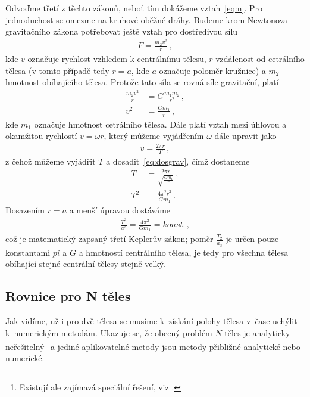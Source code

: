 \documentclass[A4paper, 12pt, oneside]{book}%
\begin{document}
Odvoďme třetí z těchto zákonů, neboť tím dokážeme vztah~\eqref{eq:n}. Pro jednoduchost se omezme na kruhové oběžné dráhy. Budeme krom Newtonova gravitačního zákona potřebovat ještě vztah pro dostředivou sílu
\begin{align}
	F=\frac{m_2v^2}{r}\,,
\end{align}
kde $v$ označuje rychlost vzhledem k centrálnímu tělesu, $r$ vzdálenost od cetrálního tělesa (v tomto případě tedy $r=a$, kde $a$ označuje poloměr kružnice) a $m_2$ hmotnost obíhajícího tělesa. Protože tato síla se rovná síle gravitační, platí
\begin{align}
	\nonumber \frac{m_2v^2}{r}&=G\frac{m_1m_2}{r^2}\,, \\
	v^2&=\frac{Gm_1}{r}\,, \label{eq:dosgrav}
\end{align}
kde $m_1$ označuje hmotnost cetrálního tělesa. Dále platí vztah mezi úhlovou a okamžitou rychlostí $v=\omega r$, který můžeme vyjádřením $\omega$ dále upravit jako
\begin{align}
	v=\frac{2\pi r}{T}\,,
\end{align}
z čehož můžeme vyjádřit $T$ a dosadit~\eqref{eq:dosgrav}, čímž dostaneme
\begin{align}
	T&=\frac{2\pi r}{\sqrt{\frac{Gm_1}{r}}}\,, \\
	T^2&=\frac{4\pi^2 r^3}{Gm_1}\,.
\end{align}
Dosazením $r=a$ a menší úpravou dostáváme
\begin{align*}
	\frac{T^2}{a^3}=\frac{4\pi^2}{Gm_1}=konst.\,,
\end{align*}
což je matematický zapsaný třetí Keplerův zákon; poměr $\frac{T_2}{a_3}$ je určen pouze konstantami $pi$ a $G$ a hmotností centrálního tělesa, je tedy pro všechna tělesa obíhající stejné centrální tělesy stejně velký.


\subsection{Rovnice pro N těles}
Jak vidíme, už i pro dvě tělesa se musíme k~získání polohy tělesa v~čase uchýlit k~numerickým metodám. Ukazuje se, že obecný problém $N$ těles je analyticky neřešitelný\footnote{Existují ale zajímavá speciální řešení, viz \cite{cohan12}.} a jediné aplikovatelné metody jsou metody přibližné analytické nebo numerické.
\end{document}
